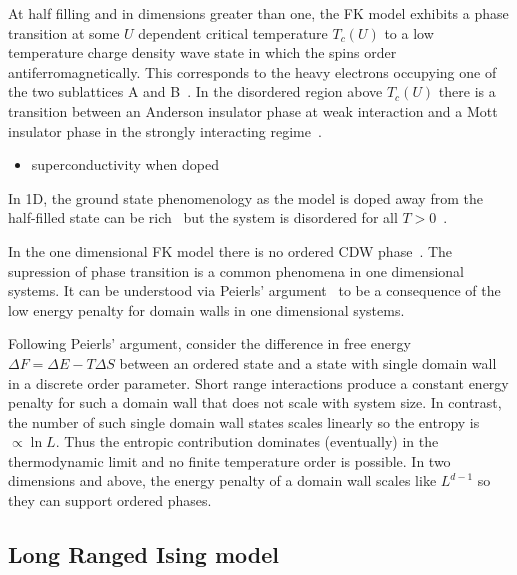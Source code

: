At half filling and in dimensions greater than one, the FK model exhibits a phase transition at some \(U\) dependent critical temperature \(T_c(U)\) to a low temperature charge density wave state in which the spins order antiferromagnetically. This corresponds to the heavy electrons occupying one of the two sublattices A and B~\autocite{maskaThermodynamicsTwodimensionalFalicovKimball2006}. In the disordered region above \(T_c(U)\) there is a transition between an Anderson insulator phase at weak interaction and a Mott insulator phase in the strongly interacting regime~\autocite{andersonAbsenceDiffusionCertain1958}.

\begin{itemize}
\tightlist
\item
  superconductivity when doped
\end{itemize}

In 1D, the ground state phenomenology as the model is doped away from the half-filled state can be rich~\autocite{gruberGroundStatesSpinless1990} but the system is disordered for all \(T > 0\)~\autocite{kennedyItinerantElectronModel1986}.

In the one dimensional FK model there is no ordered CDW phase~\autocite{liebAbsenceMottTransition1968}. The supression of phase transition is a common phenomena in one dimensional systems. It can be understood via Peierls' argument~\autocite{peierlsIsingModelFerromagnetism1936,kennedyItinerantElectronModel1986} to be a consequence of the low energy penalty for domain walls in one dimensional systems.

Following Peierls' argument, consider the difference in free energy \(\Delta F = \Delta E - T\Delta S\) between an ordered state and a state with single domain wall in a discrete order parameter. Short range interactions produce a constant energy penalty for such a domain wall that does not scale with system size. In contrast, the number of such single domain wall states scales linearly so the entropy is \(\propto \ln L\). Thus the entropic contribution dominates (eventually) in the thermodynamic limit and no finite temperature order is possible. In two dimensions and above, the energy penalty of a domain wall scales like \(L^{d-1}\) so they can support ordered phases.

\hypertarget{long-ranged-ising-model}{%
\subsection{Long Ranged Ising model}\label{long-ranged-ising-model}}

